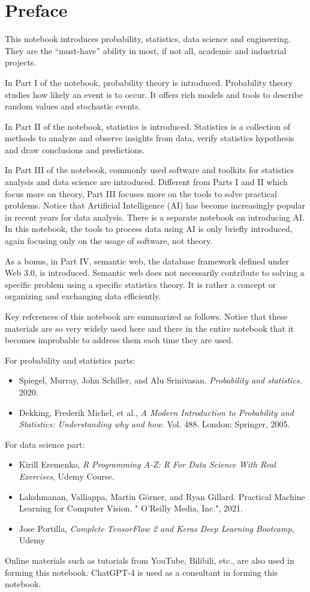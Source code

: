 \chapter*{Preface}

This notebook introduces probability, statistics, data science and engineering. They are the ``must-have'' ability in most, if not all, academic and industrial projects.

In Part I of the notebook, probability theory is introduced. Probability theory studies how likely an event is to occur. It offers rich models and tools to describe random values and stochastic events.

In Part II of the notebook, statistics is introduced. Statistics is a collection of methods to analyze and observe insights from data, verify statistics hypothesis and draw conclusions and predictions.

In Part III of the notebook, commonly used software and toolkits for statistics analysis and data science are introduced. Different from Parts I and II which focus more on theory, Part III focuses more on the tools to solve practical problems. Notice that Artificial Intelligence (AI) has become increasingly popular in recent years for data analysis. There is a separate notebook on introducing AI. In this notebook, the tools to process data using AI is only briefly introduced, again focusing only on the usage of software, not theory.

As a bonus, in Part IV, semantic web, the database framework defined under Web 3.0, is introduced. Semantic web does not necessarily contribute to solving a specific problem using a specific statistics theory. It is rather a concept or organizing and exchanging data efficiently.

Key references of this notebook are summarized as follows. Notice that these materials are so very widely used here and there in the entire notebook that it becomes improbable to address them each time they are used.

For probability and statistics parts:
\begin{itemize}
  \item Spiegel, Murray, John Schiller, and Alu Srinivasan. \textit{Probability and statistics.} 2020.
  \item Dekking, Frederik Michel, et al., \textit{A Modern Introduction to Probability and Statistics: Understanding why and how.} Vol. 488. London: Springer, 2005.
\end{itemize}
For data science part:
\begin{itemize}
  \item Kirill Eremenko, \textit{R Programming A-Z: R For Data Science With Real Exercises}, Udemy Course.
  \item Lakshmanan, Valliappa, Martin Görner, and Ryan Gillard. Practical Machine Learning for Computer Vision. " O'Reilly Media, Inc.", 2021.
  \item Jose Portilla, \textit{Complete TensorFlow 2 and Keras Deep Learning Bootcamp}, Udemy
\end{itemize}

Online materials such as tutorials from YouTube, Bilibili, etc., are also used in forming this notebook. ChatGPT-4 is used as a consultant in forming this notebook. 